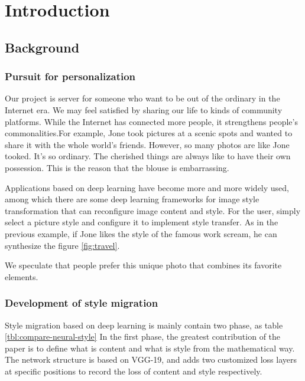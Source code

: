 
\section{Introduction}
\subsection{Background}\label{section:background}

\subsubsection{Pursuit for personalization}
Our project is server for someone who want to be out of the ordinary in the Internet era. We may feel satisfied by sharing our life to kinds of community platforms. While the Internet has connected more people, it strengthens people's commonalities.For example, Jone took pictures at a scenic spots and wanted to share it with the whole world's friends. However, so many photos are like Jone tooked. It's so ordinary. The cherished things are always like to have their own possession. This is the reason that the blouse is embarrassing.

Applications based on deep learning have become more and more widely used, among which there are some deep learning frameworks for image style transformation that can reconfigure image content and style.
For the user, simply select a picture style and configure it to implement style transfer.
As in the previous example, if Jone likes the style of the famous work scream, he can synthesize the figure \ref{fig:travel}.

We speculate that people prefer this unique photo that combines its favorite elements. 

\subsubsection{Development of style migration}\label{section:neural-style}
Style migration based on deep learning is mainly contain two phase, as table \ref{tbl:compare-neural-style}
In the first phase, the greatest contribution of the paper is to define what is content and what is style from the mathematical way.
The network structure is based on VGG-19, and adds two customized loss layers at specific positions to record the loss of content and style respectively.

